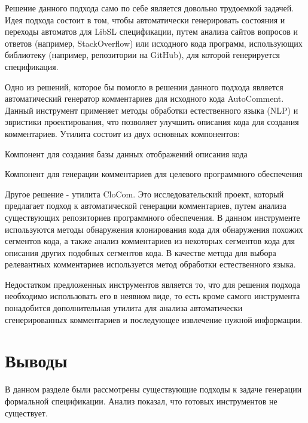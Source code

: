Решение данного подхода само по себе является довольно трудоемкой задачей. Идея подхода состоит в том, чтобы автоматически генерировать  состояния и переходы автоматов для LibSL спецификации, путем анализа сайтов вопросов и ответов (например, StackOverflow) или исходного кода программ, использующих библиотеку (например, репозитории на GitHub), для которой генерируется спецификация.

Одно из решений, которое бы помогло в решении данного подхода является автоматический генератор комментариев для исходного кода AutoComment.
Данный инструмент применяет методы обработки естественного языка (NLP) и эвристики проектирования, что позволяет улучшить описания кода для создания комментариев.
Утилита состоит из двух основных компонентов:
%
\begin{itemize*}
\item Компонент для создания базы данных отображений описания кода
\item Компонент для генерации комментариев для целевого программного обеспечения
\end{itemize*}
%

Другое решение - утилита CloCom. Это исследовательский проект, который предлагает подход к автоматической генерации комментариев, путем анализа существующих репозиториев программного обеспечения.
В данном инструменте используются методы обнаружения клонирования кода для обнаружения похожих сегментов кода, а также анализ комментариев из некоторых сегментов кода для описания других подобных сегментов кода.
В качестве метода для выбора релевантных комментариев используется метод обработки естественного языка.

Недостатком предложенных инструментов является то, что для решения подхода необходимо использовать его в неявном виде, то есть кроме самого инструмента понадобится дополнительная утилита для анализа автоматически сгенерированных комментариев и последующее извлечение нужной информации.


\section{Выводы}

В данном разделе были рассмотрены существующие подходы к задаче генерации формальной спецификации.
Анализ показал, что готовых инструментов не существует.